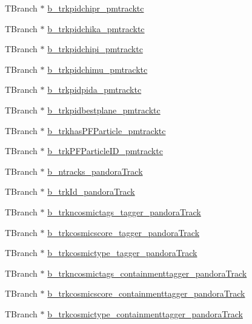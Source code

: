 \begin{DoxyCompactItemize}
\item 
T\-Branch $\ast$ \hyperlink{classanatree_ab6633c32388a18dbdac59556ec347de5}{b\-\_\-trkpidchipr\-\_\-pmtracktc}
\item 
T\-Branch $\ast$ \hyperlink{classanatree_a18677f6b18fe8f56a7063e0d81a3868b}{b\-\_\-trkpidchika\-\_\-pmtracktc}
\item 
T\-Branch $\ast$ \hyperlink{classanatree_a57b16de772a0921e339a34aa1a1edeec}{b\-\_\-trkpidchipi\-\_\-pmtracktc}
\item 
T\-Branch $\ast$ \hyperlink{classanatree_a6d2b95af5233718b6e82fb202a7c1d6c}{b\-\_\-trkpidchimu\-\_\-pmtracktc}
\item 
T\-Branch $\ast$ \hyperlink{classanatree_add485a3f544e901cf5edb8df81e9563e}{b\-\_\-trkpidpida\-\_\-pmtracktc}
\item 
T\-Branch $\ast$ \hyperlink{classanatree_a23e630df898cfb515d8d4064377bdb36}{b\-\_\-trkpidbestplane\-\_\-pmtracktc}
\item 
T\-Branch $\ast$ \hyperlink{classanatree_a45ab227987467c729806898d0ed23a5f}{b\-\_\-trkhas\-P\-F\-Particle\-\_\-pmtracktc}
\item 
T\-Branch $\ast$ \hyperlink{classanatree_aa2272aed6f8daf4970c8b10839373021}{b\-\_\-trk\-P\-F\-Particle\-I\-D\-\_\-pmtracktc}
\item 
T\-Branch $\ast$ \hyperlink{classanatree_a3fe1408a4b38ef9ccce5cb055e4ef1a6}{b\-\_\-ntracks\-\_\-pandora\-Track}
\item 
T\-Branch $\ast$ \hyperlink{classanatree_a032199668b40171279c6d42655ae8692}{b\-\_\-trk\-Id\-\_\-pandora\-Track}
\item 
T\-Branch $\ast$ \hyperlink{classanatree_a49f812bf3a93903d7b6101d93180fa94}{b\-\_\-trkncosmictags\-\_\-tagger\-\_\-pandora\-Track}
\item 
T\-Branch $\ast$ \hyperlink{classanatree_a1ad8e0ae9b7214697bb471609cc4af0b}{b\-\_\-trkcosmicscore\-\_\-tagger\-\_\-pandora\-Track}
\item 
T\-Branch $\ast$ \hyperlink{classanatree_a2ad042b0c5fb7ec3e96e9da8037119f4}{b\-\_\-trkcosmictype\-\_\-tagger\-\_\-pandora\-Track}
\item 
T\-Branch $\ast$ \hyperlink{classanatree_a96205e309f975ee102c33cb8b84e324c}{b\-\_\-trkncosmictags\-\_\-containmenttagger\-\_\-pandora\-Track}
\item 
T\-Branch $\ast$ \hyperlink{classanatree_af4c33dc332c24a2b75dcdef4cd9d4e10}{b\-\_\-trkcosmicscore\-\_\-containmenttagger\-\_\-pandora\-Track}
\item 
T\-Branch $\ast$ \hyperlink{classanatree_aaa3c883252cdaf10fb0deddf5c8a83c9}{b\-\_\-trkcosmictype\-\_\-containmenttagger\-\_\-pandora\-Track}

\end{DoxyCompactItemize}
